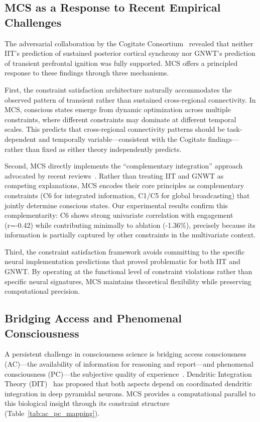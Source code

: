 \documentclass[10pt,journal,compsoc]{IEEEtran}
\begin{document}
\subsection{MCS as a Response to Recent Empirical Challenges}

The adversarial collaboration by the Cogitate Consortium~\cite{Melloni2025} revealed that neither IIT's prediction of sustained posterior cortical synchrony nor GNWT's prediction of transient prefrontal ignition was fully supported. MCS offers a principled response to these findings through three mechanisms.

First, the constraint satisfaction architecture naturally accommodates the observed pattern of transient rather than sustained cross-regional connectivity. In MCS, conscious states emerge from dynamic optimization across multiple constraints, where different constraints may dominate at different temporal scales. This predicts that cross-regional connectivity patterns should be task-dependent and temporally variable—consistent with the Cogitate findings—rather than fixed as either theory independently predicts.

Second, MCS directly implements the ``complementary integration'' approach advocated by recent reviews~\cite{Storm2024}. Rather than treating IIT and GNWT as competing explanations, MCS encodes their core principles as complementary constraints (C6 for integrated information, C1/C5 for global broadcasting) that jointly determine conscious states. Our experimental results confirm this complementarity: C6 shows strong univariate correlation with engagement (r=-0.42) while contributing minimally to ablation (-1.36\%), precisely because its information is partially captured by other constraints in the multivariate context.

Third, the constraint satisfaction framework avoids committing to the specific neural implementation predictions that proved problematic for both IIT and GNWT. By operating at the functional level of constraint violations rather than specific neural signatures, MCS maintains theoretical flexibility while preserving computational precision.

\subsection{Bridging Access and Phenomenal Consciousness}

A persistent challenge in consciousness science is bridging access consciousness (AC)—the availability of information for reasoning and report—and phenomenal consciousness (PC)—the subjective quality of experience~\cite{Storm2024}. Dendritic Integration Theory (DIT)~\cite{Bachmann2020, Aru2020} has proposed that both aspects depend on coordinated dendritic integration in deep pyramidal neurons. MCS provides a computational parallel to this biological insight through its constraint structure (Table~\ref{tab:ac_pc_mapping}).
\end{document}
